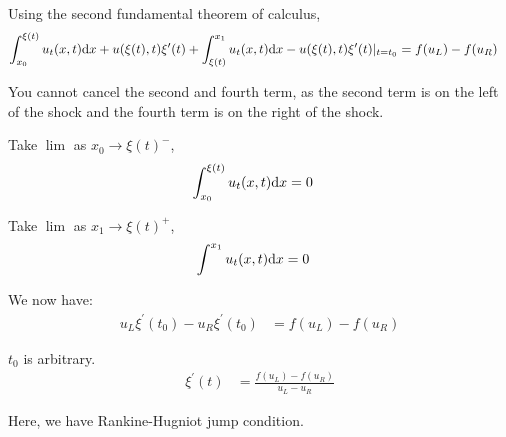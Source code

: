\documentclass{article}
\begin{document}
  Using the second fundamental theorem of calculus,
  \begin{align}
    \int^{\xi(t)}_{x_0} u_t(x, t) \text dx + u(\xi(t), t) \xi^\prime(t) + \int^{x_1}_{\xi(t)} u_t(x, t) \text dx - u(\xi(t), t)\xi^\prime(t)|_{t = t_0} & = f(u_L) - f(u_R)
  \end{align}

  You cannot cancel the second and fourth term, as the second term is on the left of the shock and the fourth term is on the right of the shock.

  Take $\lim$ as $x_0 \to \xi(t)^-$,
  \begin{align}
    \int^{\xi(t)}_{x_0} u_t(x, t) \text dx & = 0
  \end{align}

  Take $\lim$ as $x_1 \to \xi(t)^+$,
  \begin{align}
    \int^{x_1} u_t(x, t) \text dx & = 0
  \end{align}

  We now have:
  \begin{align}
    u_L \xi^\prime(t_0) - u_R \xi^\prime(t_0) & = f(u_L) - f(u_R)
  \end{align}

  $t_0$ is arbitrary.
  \begin{align}
    \xi^\prime(t) & = \frac{f(u_L) - f(u_R)}{u_L - u_R}
  \end{align}

  Here, we have Rankine-Hugniot jump condition.
\end{document}
